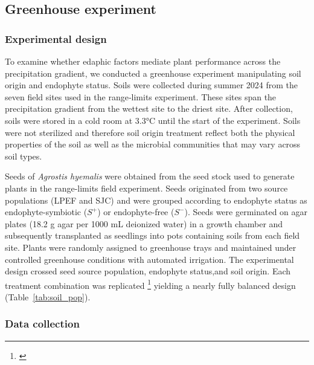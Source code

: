 \documentclass[12pt]{article}\usepackage[]{graphicx}\usepackage[dvipsnames]{xcolor}
\newcommand{\tom}[2]{{\color{red}{#1}}\footnote{\textit{\color{red}{#2}}}}
\begin{document}
{\subsection*{Greenhouse experiment}
\label{sec:greenhouse}

\subsubsection*{Experimental design}

To examine whether edaphic factors mediate plant performance across the precipitation gradient, we conducted a greenhouse experiment
manipulating soil origin and endophyte status.
Soils were collected during summer 2024 from the seven field sites used in the range‐limits experiment.
These sites span the precipitation gradient from the wettest site to the driest site. 
After collection, soils were stored in a cold room at 3.3°C until the start of the experiment. 
Soils were not sterilized and therefore soil origin treatment reflect both the physical properties of the soil as well as the microbial communities that may vary across soil types.

Seeds of \textit{Agrostis hyemalis} were obtained from the seed stock used to generate plants in the range-limits field experiment. 
Seeds originated from two source populations (LPEF and SJC) and were grouped according to endophyte status as endophyte-symbiotic ($S^{+}$) or endophyte-free ($S^{-}$).
Seeds were germinated on agar plates (18.2 g agar per 1000 mL deionized water) in a growth chamber and subsequently transplanted as seedlings
into pots containing soils from each field site. 
Plants were randomly assigned to greenhouse trays and maintained under controlled greenhouse conditions with automated irrigation.
The experimental design crossed seed source population, endophyte status,and soil origin. 
Each treatment combination was replicated \tom{seven times,}{I don't think we actually reached 7 reps for most treatments because of mortality or poor germination, so I would report the realized sample sizes in the table.}
yielding a nearly fully balanced design (Table~\ref{tab:soil_pop}).

\subsubsection*{Data collection}

}
\end{document}
